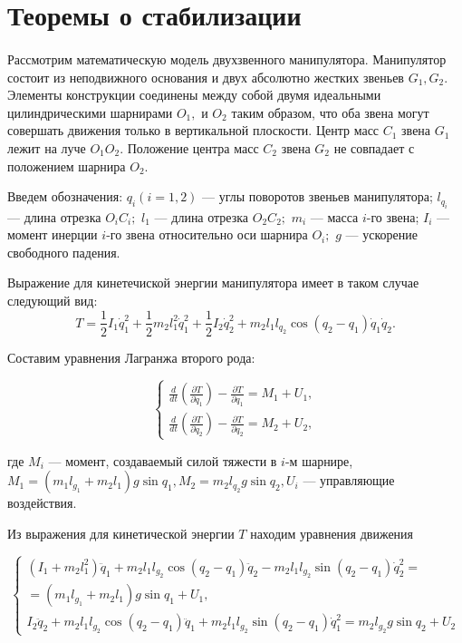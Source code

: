 \section{Теоремы о стабилизации} \label{p21}
\paragraph{}
Рассмотрим математическую модель двухзвенного манипулятора. Манипулятор состоит из неподвижного основания и двух абсолютно жестких звеньев $G_1, G_2$. Элементы конструкции соединены между собой двумя идеальными цилиндрическими шарнирами $O_1,$ и $O_2$ таким образом, что оба звена могут совершать движения только в вертикальной плоскости. Центр масс $C_1$ звена $G_1$ лежит на луче $O_1 O_2.$ Положение центра масс $C_2$ звена $G_2$ не совпадает с положением шарнира $O_2$.

Введем обозначения: $q_i (i=1, 2)$ --- углы поворотов звеньев манипулятора; $l_{q_i}$ --- длина отрезка $O_i C_i;$ $l_1$ --- длина отрезка $O_2 C_2;$ $m_i$  ---  масса   $i$-го звена;   $I_i$ --- момент инерции  $i$-го звена относительно оси шарнира $O_i;$ $g$ --- ускорение свободного падения.

Выражение для кинетечиской энергии манипулятора имеет в таком случае следующий вид:
\begin{equation}
T = \frac{1}{2} I_1 \dot q_1^2 + \frac12 m_2 l_1^2 \dot q_1^2 + \frac12 I_2 \dot q_2^2 + m_2 l_1 l_{q_2} \cos (q_2 - q_1) \dot q_1 \dot q_2.
\end{equation}

Составим уравнения Лагранжа второго рода:

\begin{equation}
\begin{cases}
\frac{d}{dt} (\frac{\partial T}{\partial \dot q_1}) - \frac{\partial T}{\partial q_1} = M_1 + U_1, 
\\
\frac{d}{dt} (\frac{\partial T}{\partial \dot q_2}) - \frac{\partial T}{\partial q_2} = M_2 + U_2,
\end{cases}
\end{equation}

где $M_i$ --- момент, создаваемый силой тяжести в $i$-м шарнире, $M_1 = (m_1 l_{g_1} + m_2 l_1) g \sin q_1, M_2 = m_2 l_{q_2} g \sin q_2, U_i $ --- управляющие воздействия.

Из выражения для кинетической энергии $T$ находим уравнения движения

\begin{equation}\label{2.1'}
\begin{cases}
(I_1 + m_2 l_1^2) \ddot q_1 + m_2 l_1 l_{g_2} \cos(q_2 - q_1) \ddot q_2 - m_2 l_1 l_{g_2} \sin(q_2 - q_1) \dot q_2^2 = \\ = (m_1 l_{g_1} + m_2 l_1) g \sin q_1 + U_1,
\\
I_2 \ddot q_2 + m_2 l_1 l_{g_2} \cos(q_2 - q_1) \ddot q_1 + m_2 l_1 l_{g_2} \sin(q_2 - q_1) \dot q_1^2 = m_2 l_{g_2} g \sin q_2 + U_2
\end{cases}
\end{equation}

